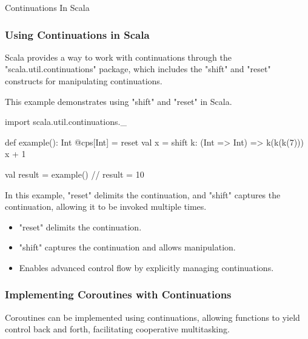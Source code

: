 \begin{notes}{Continuations In Scala}
\begin{highlight}
    \end{highlight}
    
    \subsubsection*{Using Continuations in Scala}
    
    Scala provides a way to work with continuations through the "scala.util.continuations" package, which includes the "shift" and "reset" constructs for manipulating continuations.
    
    \begin{highlight}
    
        This example demonstrates using "shift" and "reset" in Scala.
    
    \begin{code}[Scala]
    import scala.util.continuations._
    
    def example(): Int @cps[Int] = reset {
        val x = shift { k: (Int => Int) => k(k(k(7))) }
        x + 1
    }
    
    val result = example()  // result = 10
    \end{code}
    
        In this example, "reset" delimits the continuation, and "shift" captures the continuation, allowing it to be invoked multiple times.
    
        \begin{itemize}
            \item "reset" delimits the continuation.
            \item "shift" captures the continuation and allows manipulation.
            \item Enables advanced control flow by explicitly managing continuations.
        \end{itemize}
    
    \end{highlight}
    
    \subsubsection*{Implementing Coroutines with Continuations}
    
    Coroutines can be implemented using continuations, allowing functions to yield control back and forth, facilitating cooperative multitasking.
    
    \begin{highlight}
    

\end{highlight}
\end{notes}
